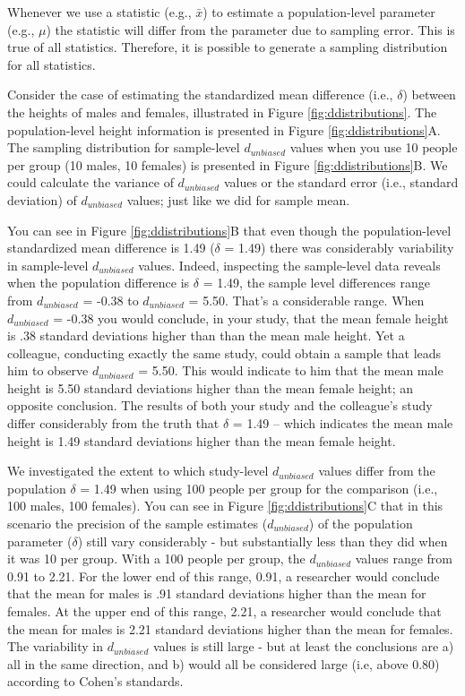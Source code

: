 \documentclass[
]{krantz}
\begin{document}
Whenever we use a statistic (e.g., \(\bar{x}\)) to estimate a population-level parameter (e.g., \(\mu\)) the statistic will differ from the parameter due to sampling error. This is true of all statistics. Therefore, it is possible to generate a sampling distribution for all statistics.

Consider the case of estimating the standardized mean difference (i.e., \(\delta\)) between the heights of males and females, illustrated in Figure \ref{fig:ddistributions}. The population-level height information is presented in Figure \ref{fig:ddistributions}A. The sampling distribution for sample-level \(d_{unbiased}\) values when you use 10 people per group (10 males, 10 females) is presented in Figure \ref{fig:ddistributions}B. We could calculate the variance of \(d_{unbiased}\) values or the standard error (i.e., standard deviation) of \(d_{unbiased}\) values; just like we did for sample mean.

You can see in Figure \ref{fig:ddistributions}B that even though the population-level standardized mean difference is 1.49 (\(\delta\) = 1.49) there was considerably variability in sample-level \(d_{unbiased}\) values. Indeed, inspecting the sample-level data reveals when the population difference is \(\delta\) = 1.49, the sample level differences range from \(d_{unbiased}\) = -0.38 to \(d_{unbiased}\) = 5.50. That's a considerable range. When \(d_{unbiased}\) = -0.38 you would conclude, in your study, that the mean female height is .38 standard deviations higher than than the mean male height. Yet a colleague, conducting exactly the same study, could obtain a sample that leads him to observe \(d_{unbiased}\) = 5.50. This would indicate to him that the mean male height is 5.50 standard deviations higher than the mean female height; an opposite conclusion. The results of both your study and the colleague's study differ considerably from the truth that \(\delta\) = 1.49 -- which indicates the mean male height is 1.49 standard deviations higher than the mean female height.

We investigated the extent to which study-level \(d_{unbiased}\) values differ from the population \(\delta\) = 1.49 when using 100 people per group for the comparison (i.e., 100 males, 100 females).
You can see in Figure \ref{fig:ddistributions}C that in this scenario the precision of the sample estimates (\(d_{unbiased}\)) of the population parameter (\(\delta\)) still vary considerably - but substantially less than they did when it was 10 per group. With a 100 people per group, the \(d_{unbiased}\) values range from 0.91 to 2.21. For the lower end of this range, 0.91, a researcher would conclude that the mean for males is .91 standard deviations higher than the mean for females. At the upper end of this range, 2.21, a researcher would conclude that the mean for males is 2.21 standard deviations higher than the mean for females. The variability in \(d_{unbiased}\) values is still large - but at least the conclusions are a) all in the same direction, and b) would all be considered large (i.e, above 0.80) according to Cohen's standards.
\end{document}
